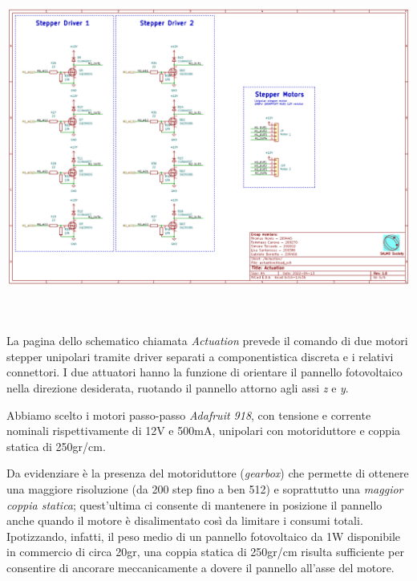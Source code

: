 \begin{center}
\includegraphics[width=6.5in,height=4.48611in]{figures/image41.png}
\captionsetup{type=figure}
\end{center}

La pagina dello schematico chiamata \emph{Actuation} prevede il comando
di due motori stepper unipolari tramite driver separati a
componentistica discreta e i relativi connettori. I due attuatori hanno
la funzione di orientare il pannello fotovoltaico nella direzione
desiderata, ruotando il pannello attorno agli assi \emph{z} e \emph{y}.

Abbiamo scelto i motori passo-passo \emph{Adafruit 918}, con tensione e
corrente nominali rispettivamente di 12V e 500mA, unipolari con
motoriduttore e coppia statica di 250gr/cm.

Da evidenziare è la presenza del motoriduttore (\emph{gearbox}) che
permette di ottenere una maggiore risoluzione (da 200 step fino a ben
512) e soprattutto una \emph{maggior coppia statica}; quest'ultima ci
consente di mantenere in posizione il pannello anche quando il motore è
disalimentato così da limitare i consumi totali. Ipotizzando, infatti,
il peso medio di un pannello fotovoltaico da 1W disponibile in commercio
di circa 20gr, una coppia statica di 250gr/cm risulta sufficiente per
consentire di ancorare meccanicamente a dovere il pannello all'asse del
motore.

